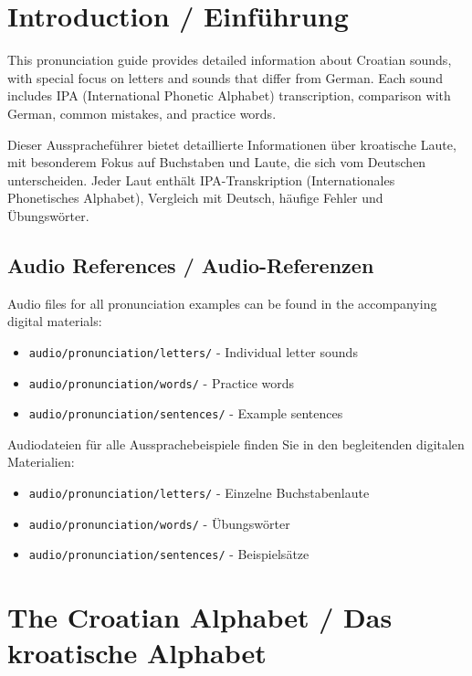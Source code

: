 
\section{Introduction / Einführung}

This pronunciation guide provides detailed information about Croatian sounds, with special focus on letters and sounds that differ from German. Each sound includes IPA (International Phonetic Alphabet) transcription, comparison with German, common mistakes, and practice words.

Dieser Ausspracheführer bietet detaillierte Informationen über kroatische Laute, mit besonderem Fokus auf Buchstaben und Laute, die sich vom Deutschen unterscheiden. Jeder Laut enthält IPA-Transkription (Internationales Phonetisches Alphabet), Vergleich mit Deutsch, häufige Fehler und Übungswörter.

\subsection{Audio References / Audio-Referenzen}

Audio files for all pronunciation examples can be found in the accompanying digital materials:
\begin{itemize}
    \item \texttt{audio/pronunciation/letters/} - Individual letter sounds
    \item \texttt{audio/pronunciation/words/} - Practice words
    \item \texttt{audio/pronunciation/sentences/} - Example sentences
\end{itemize}

Audiodateien für alle Aussprachebeispiele finden Sie in den begleitenden digitalen Materialien:
\begin{itemize}
    \item \texttt{audio/pronunciation/letters/} - Einzelne Buchstabenlaute
    \item \texttt{audio/pronunciation/words/} - Übungswörter
    \item \texttt{audio/pronunciation/sentences/} - Beispielsätze
\end{itemize}

\section{The Croatian Alphabet / Das kroatische Alphabet}

